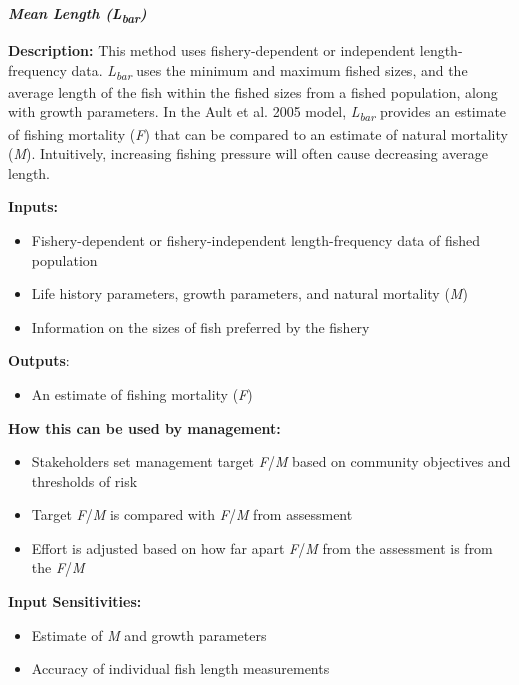 \documentclass[]{book}
\providecommand{\tightlist}{%
  \setlength{\itemsep}{0pt}\setlength{\parskip}{0pt}}
\begin{document}
\textbf{\emph{Mean Length (L\textsubscript{bar})}}

\textbf{Description:} This method uses fishery-dependent or independent
length-frequency data. \emph{L\textsubscript{bar}} uses the minimum and
maximum fished sizes, and the average length of the fish within the
fished sizes from a fished population, along with growth parameters. In
the Ault et al. 2005 model, \emph{L\textsubscript{bar}} provides an
estimate of fishing mortality (\emph{F}) that can be compared to an
estimate of natural mortality (\emph{M}). Intuitively, increasing
fishing pressure will often cause decreasing average length.

\textbf{Inputs: }

\begin{itemize}
\item
  Fishery-dependent or fishery-independent length-frequency data of
  fished population
\item
  Life history parameters, growth parameters, and natural mortality
  (\emph{M})
\item
  Information on the sizes of fish preferred by the fishery
\end{itemize}

\textbf{Outputs}:

\begin{itemize}
\tightlist
\item
  An estimate of fishing mortality (\emph{F})
\end{itemize}

\textbf{How this can be used by management:}

\begin{itemize}
\item
  Stakeholders set management target \emph{F}/\emph{M} based on
  community objectives and thresholds of risk
\item
  Target \emph{F}/\emph{M} is compared with \emph{F}/\emph{M} from
  assessment
\item
  Effort is adjusted based on how far apart \emph{F}/\emph{M} from the
  assessment is from the \emph{F}/\emph{M}
\end{itemize}

\textbf{Input Sensitivities: }

\begin{itemize}
\item
  Estimate of \emph{M} and growth parameters
\item
  Accuracy of individual fish length measurements
\end{itemize}
\end{document}
